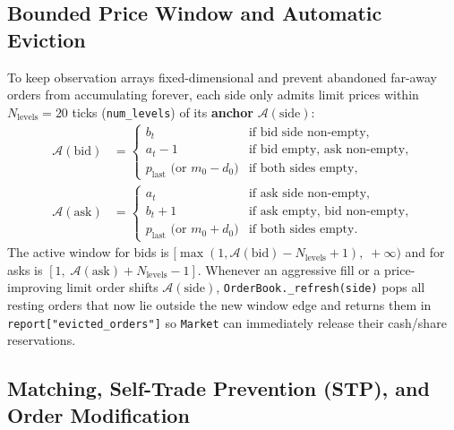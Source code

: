 \documentclass[11pt,a4paper]{article}
\newcommand{\code}[1]{\texttt{#1}}
\begin{document}
\subsection{Bounded Price Window and Automatic Eviction}

To keep observation arrays fixed-dimensional and prevent abandoned far-away orders from accumulating
forever, each side only admits limit prices within $N_{\text{levels}} = 20$ ticks (\code{num\_levels})
of its \textbf{anchor} $\mathcal{A}(\text{side})$:
\begin{align}
  \mathcal{A}(\text{bid}) &= \begin{cases}
    b_t & \text{if bid side non-empty}, \\
    a_t - 1 & \text{if bid empty, ask non-empty}, \\
    p_{\text{last}} \text{ (or } m_0 - d_0\text{)} & \text{if both sides empty},
  \end{cases} \\
  \mathcal{A}(\text{ask}) &= \begin{cases}
    a_t & \text{if ask side non-empty}, \\
    b_t + 1 & \text{if ask empty, bid non-empty}, \\
    p_{\text{last}} \text{ (or } m_0 + d_0\text{)} & \text{if both sides empty}.
  \end{cases}
\end{align}
The active window for bids is $[\max(1, \mathcal{A}(\text{bid}) - N_{\text{levels}} + 1),\; +\infty)$
and for asks is $[1,\; \mathcal{A}(\text{ask}) + N_{\text{levels}} - 1]$. Whenever an aggressive fill or
a price-improving limit order shifts $\mathcal{A}(\text{side})$, \code{OrderBook.\_refresh(side)} pops
all resting orders that now lie outside the new window edge and returns them in
\code{report["evicted\_orders"]} so \code{Market} can immediately release their cash/share reservations.

\subsection{Matching, Self-Trade Prevention (STP), and Order Modification}
\end{document}
